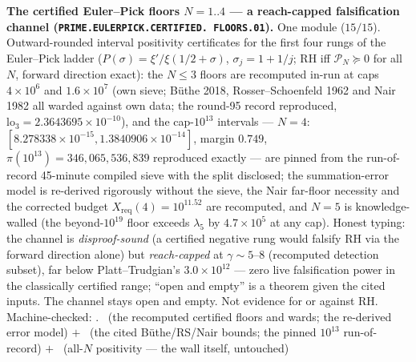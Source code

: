 \par\smallskip\noindent\textbf{The certified Euler--Pick floors
$N = 1..4$ --- a reach-capped falsification channel
(\texttt{PRIME.EULERPICK.\allowbreak CERTIFIED.\allowbreak
FLOORS.01}).}
One module ($15/15$).  Outward-rounded interval positivity
certificates for the first four rungs of the Euler--Pick ladder
($P(\sigma) = \xi'/\xi(1/2+\sigma)$, $\sigma_j = 1 + 1/j$; RH iff
$\mathcal P_N \succeq 0$ for all $N$, forward direction exact):
the $N \le 3$ floors are recomputed in-run at caps $4\times10^6$
and $1.6\times10^7$ (own sieve; B\"uthe 2018, Rosser--Schoenfeld
1962 and Nair 1982 all warded against own data; the round-95
record reproduced, $\mathrm{lo}_3 = 2.3643695\times10^{-10}$),
and the cap-$10^{13}$ intervals --- $N = 4$:
$[8.278338\times10^{-15}, 1.3840906\times10^{-14}]$, margin
$0.749$, $\pi(10^{13}) = 346{,}065{,}536{,}839$ reproduced
exactly --- are pinned from the run-of-record 45-minute compiled
sieve with the split disclosed; the summation-error model is
re-derived rigorously without the sieve, the Nair far-floor
necessity and the corrected budget
$X_{\mathrm{req}}(4) = 10^{11.52}$ are recomputed, and $N = 5$
is knowledge-walled (the beyond-$10^{19}$ floor exceeds
$\lambda_5$ by $4.7\times10^{5}$ at any cap).  Honest typing:
the channel is \emph{disproof-sound} (a certified negative rung
would falsify RH via the forward direction alone) but
\emph{reach-capped} at $\gamma \sim 5$--$8$ (recomputed
detection subset), far below Platt--Trudgian's
$3.0\times10^{12}$ --- zero live falsification power in the
classically certified range; ``open and empty'' is a theorem
given the cited inputs.  The channel stays open and empty.  Not
evidence for or against RH.
Machine-checked: .
\mE\ (the recomputed certified floors and wards; the re-derived
error model) $+$ \mC\ (the cited B\"uthe/RS/Nair bounds; the
pinned $10^{13}$ run-of-record) $+$ \mO\ (all-$N$ positivity ---
the wall itself, untouched)
\par\smallskip


